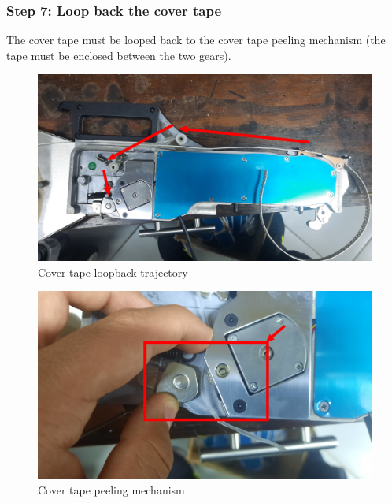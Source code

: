 \documentclass[a4paper,10pt]{report}
\begin{document}
\subsubsection{Step 7: Loop back the cover tape}
The cover tape must be looped back to the cover tape peeling mechanism (the tape must be enclosed between the two gears).
\begin{figure}[!htb]
 \centering
 \includegraphics[width=1\textwidth]{images/step7.png}
 \caption{Cover tape loopback trajectory}
\end{figure}
\begin{figure}[!htb]
 \centering
 \includegraphics[width=1\textwidth]{images/peeler.png}
 \caption{Cover tape peeling mechanism}
\end{figure}
\newpage
\end{document}
